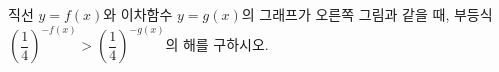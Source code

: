 \noindent\begin{minipage}[t]{0.58\linewidth}\vspace{0pt}\raggedright 직선 $y=f(x)$와 이차함수 $y=g(x)$의 그래프가 오른쪽 그림과 같을 때, 부등식 $\left(\dfrac{1}{4}\right)^{-f(x)}>\left(\dfrac{1}{4}\right)^{-g(x)}$의 해를 구하시오.\end{minipage}\hfill\begin{minipage}[t]{0.4\linewidth}\vspace{0pt}\centering \resizebox{\ifdim\width>\linewidth\linewidth\else\width\fi}{!}{}\end{minipage}\par
